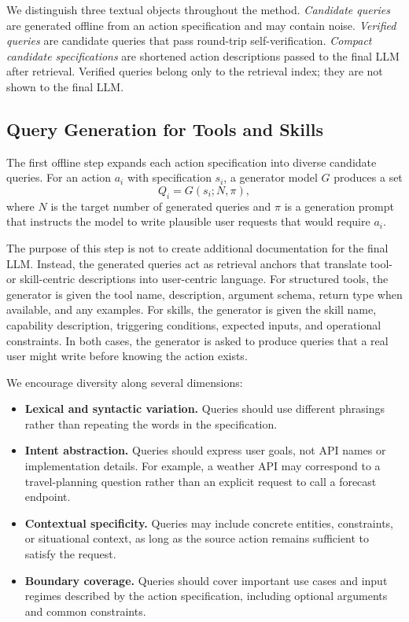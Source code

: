 \documentclass[11pt]{article}
\begin{document}
We distinguish three textual objects throughout the method. \emph{Candidate queries} are generated offline from an action specification and may contain noise. \emph{Verified queries} are candidate queries that pass round-trip self-verification. \emph{Compact candidate specifications} are shortened action descriptions passed to the final LLM after retrieval. Verified queries belong only to the retrieval index; they are not shown to the final LLM.

\subsection{Query Generation for Tools and Skills}
\label{sec:query_generation}

The first offline step expands each action specification into diverse candidate queries. For an action $a_i$ with specification $s_i$, a generator model $G$ produces a set
\begin{equation}
    Q_i = G(s_i; N, \pi),
\end{equation}
where $N$ is the target number of generated queries and $\pi$ is a generation prompt that instructs the model to write plausible user requests that would require $a_i$.

The purpose of this step is not to create additional documentation for the final LLM. Instead, the generated queries act as retrieval anchors that translate tool- or skill-centric descriptions into user-centric language. For structured tools, the generator is given the tool name, description, argument schema, return type when available, and any examples. For skills, the generator is given the skill name, capability description, triggering conditions, expected inputs, and operational constraints. In both cases, the generator is asked to produce queries that a real user might write before knowing the action exists.

We encourage diversity along several dimensions:
\begin{itemize}
    \item \textbf{Lexical and syntactic variation.} Queries should use different phrasings rather than repeating the words in the specification.
    \item \textbf{Intent abstraction.} Queries should express user goals, not API names or implementation details. For example, a weather API may correspond to a travel-planning question rather than an explicit request to call a forecast endpoint.
    \item \textbf{Contextual specificity.} Queries may include concrete entities, constraints, or situational context, as long as the source action remains sufficient to satisfy the request.
    \item \textbf{Boundary coverage.} Queries should cover important use cases and input regimes described by the action specification, including optional arguments and common constraints.
\end{itemize}
\end{document}
